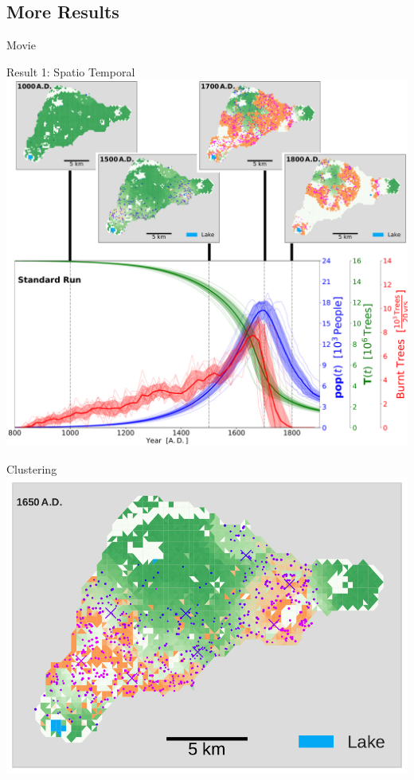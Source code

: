 \subsection{More Results}


\begin{frame}{Movie}
\end{frame}



\begin{frame}{Result 1: Spatio Temporal}
\centering
\includegraphics[width=0.6\linewidth]{../../Thesis/images/Results/Standard/EnsembleStatistics+Panels}
\end{frame}


\begin{frame}{Clustering}
	\centering
	\includegraphics[width=0.7\linewidth]{../../Thesis/images/ClusterSTDS1650}
\end{frame}


